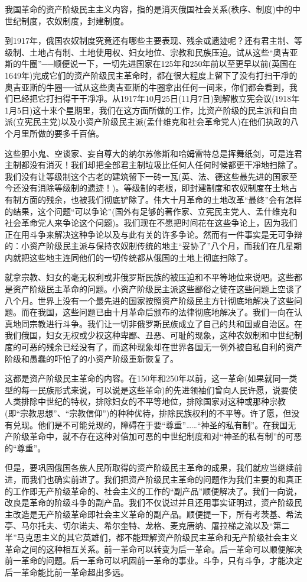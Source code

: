 \documentclass[UTF8, 12pt, a4paper]{ctexrep}
\begin{document}
我国革命的资产阶级民主主义内容，指的是消灭俄国社会关系(秩序、制度)中的中世纪制度，农奴制度，封建制度。

到1917年，俄国农奴制度究竟还有哪些主要表现、残余或遗迹呢？还有君主制、等级制、土地占有制、土地使用权、妇女地位、宗教和民族压迫。试从这些“奥吉亚斯的牛圈”──顺便说一下，一切先进国家在125年和250年前以至更早以前(英国在1649年)完成它们的资产阶级民主革命时，都在很大程度上留下了没有打扫干凈的奥吉亚斯的牛圈──试从这些奥吉亚斯的牛圈拿出任何一间来，你们都会看到，我们已经把它打扫得干干凈凈。从1917年10月25日(11月7日)到解散立宪会议(1918年1月5日)这十来个星期里，我们在这方面所做的工作，比资产阶级的民主派和自由派(立宪民主党)以及小资产阶级民主派(孟什维克和社会革命党人)在他们执政的八个月里所做的要多千百倍。

这些胆小鬼、空谈家、妄自尊大的纳尔苏修斯和哈姆雷特总是挥舞纸剑，可是连君主制都没有消灭！我们却把全部君主制垃圾比任何人任何时候都更干凈地扫除了。我们没有让等级制这个古老的建筑留下一砖一瓦(英、法、德这些最先进的国家至今还没有消除等级制的遗迹！)。等级制的老根，即封建制度和农奴制度在土地占有制方面的残余，也被我们彻底铲除了。伟大十月革命的土地改革“最终”会有怎样的结果，这个问题“可以争论”(国外有足够的著作家、立宪民主党人、孟什维克和社会革命党人来争论这个问题)。我们现在不愿把时间花在这些争论上，因为我们正在用斗争来解决这种争论以及与此有关的许多争论。然而有一件事实是无可争辩的：小资产阶级民主派与保持农奴制传统的地主“妥协了”八个月，而我们在几星期内就把这些地主连同他们的一切传统都从俄国的土地上彻底扫除了。

就拿宗教、妇女的毫无权利或非俄罗斯民族的被压迫和不平等地位来说吧。这些都是资产阶级民主革命的问题。小资产阶级民主派这些鄙俗之徒在这些问题上空谈了八个月。世界上没有一个最先进的国家按照资产阶级民主方针彻底地解决了这些问题。而在我国，这些问题已由十月革命后颁布的法律彻底地解决了。我们一向在认真地同宗教进行斗争。我们让一切非俄罗斯民族成立了自己的共和国或自治区。在我们俄国，妇女无权或少权这种卑鄙、丑恶、可耻的现象，这种农奴制和中世纪制度的可恶的残余已经没有了，而这种现象却在世界各国无一例外被自私自利的资产阶级和愚蠢的吓怕了的小资产阶级重新恢复了。

这都是资产阶级民主革命的内容。在150年和250年以前，这一革命(如果就同一类型的每一民族形式来说，可以说是这些革命)的先进领袖们曾向人民许愿，说要使人类排除中世纪的特权，排除妇女的不平等地位，排除国家对这种或那种宗教(即“宗教思想”、“宗教信仰”)的种种优待，排除民族权利的不平等。许了愿，但没有兑现。他们是不可能兑现的，障碍在于要“尊重”……“神圣的私有制”。在我国无产阶级革命中，就不存在这种对倍加可恶的中世纪制度和对“神圣的私有制”的可恶的“尊重”。

但是，要巩固俄国各族人民所取得的资产阶级民主革命的成果，我们就应当继续前进，而我们也确实前进了。我们把资产阶级民主革命的问题作为我们主要的和真正的工作即无产阶级革命的、社会主义的工作的“副产品”顺便解决了。我们一向说，改良是革命的阶级斗争的副产品。我们不仅说过并且还用事实证明过，资产阶级民主改造是无产阶级革命即社会主义革命的副产品。顺便提一下，所有考茨基、希法亭、马尔托夫、切尔诺夫、希尔奎特、龙格、麦克唐纳、屠拉梯之流以及“第二半”马克思主义的其它英雄们，都不能理解资产阶级民主革命和无产阶级社会主义革命之间的这种相互关系。前一革命可以转变为后一革命。后一革命可以顺便解决前一革命的问题。后一革命可以巩固前一革命的事业。斗争，只有斗争，才能决定后一革命能比前一革命超出多远。
\end{document}
